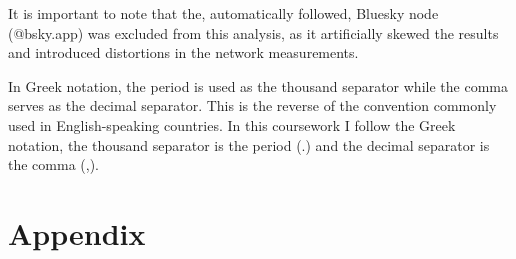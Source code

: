 \documentclass[
	a4paper, %
	12pt, %
	twoside, %
]{LTJournalArticle}
\begin{document}
It is important to note that the, automatically followed, Bluesky node (@bsky.app) was excluded from this analysis, as it artificially skewed the results and introduced distortions in the network measurements.

In Greek notation, the period is used as the thousand separator while the comma serves as the decimal separator. This is the reverse of the convention commonly used in English-speaking countries. In this coursework I follow the Greek notation, the thousand separator is the period (.) and the decimal separator is the comma (,).


\section{Appendix}
\end{document}
